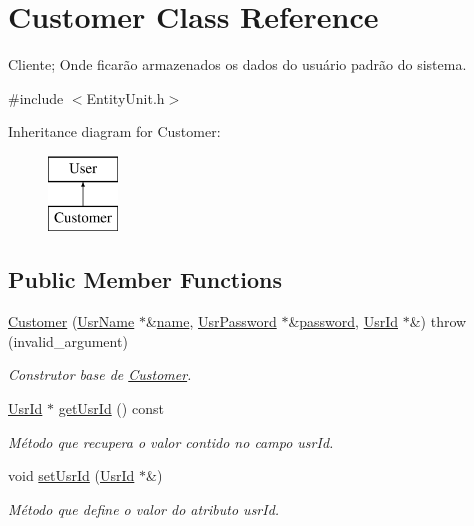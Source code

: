 \hypertarget{classCustomer}{\section{Customer Class Reference}
\label{d9/d12/classCustomer}
}


Cliente; Onde ficarão armazenados os dados do usuário padrão do sistema.  




{\ttfamily \#include $<$Entity\-Unit.\-h$>$}

Inheritance diagram for Customer\-:\begin{figure}[H]
\begin{center}
\leavevmode
\includegraphics[height=2.000000cm]{d9/d12/classCustomer}
\end{center}
\end{figure}
\subsection*{Public Member Functions}
\begin{DoxyCompactItemize}
\item 
\hyperlink{classCustomer_a79d3f9de7f2ad3ad994cab4d1f278729}{Customer} (\hyperlink{classUsrName}{Usr\-Name} $\ast$\&\hyperlink{classUser_a91c191dfccf48b4f9fcf325a86359cbf}{name}, \hyperlink{classUsrPassword}{Usr\-Password} $\ast$\&\hyperlink{classUser_a101edbffd592c3254f990671be952758}{password}, \hyperlink{classUsrId}{Usr\-Id} $\ast$\&)  throw (invalid\-\_\-argument)
\begin{DoxyCompactList}\small\item\em Construtor base de \hyperlink{classCustomer}{Customer}. \end{DoxyCompactList}\item 
\hyperlink{classUsrId}{Usr\-Id} $\ast$ \hyperlink{classCustomer_aeade3950e4067d88836ecf345a3d798a}{get\-Usr\-Id} () const 
\begin{DoxyCompactList}\small\item\em Método que recupera o valor contido no campo usr\-Id. \end{DoxyCompactList}\item 
void \hyperlink{classCustomer_a6ad6b5cedd830d6ead147b57d589dfc7}{set\-Usr\-Id} (\hyperlink{classUsrId}{Usr\-Id} $\ast$\&)
\begin{DoxyCompactList}\small\item\em Método que define o valor do atributo usr\-Id. \end{DoxyCompactList}\end{DoxyCompactItemize}
